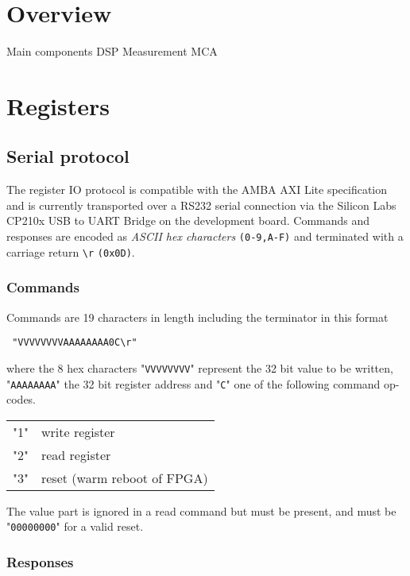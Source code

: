 \documentclass{article}
\newcommand{\code}[1]{\texttt{#1}}
\newenvironment{fielddesc}
{\texttt\bgroup}
{\egroup}
\newcommand{\return}{\code{\textbackslash r}}
\begin{document}
\section{Overview}
Main components 
DSP 
Measurement
MCA


\section{Registers}

\subsection{Serial protocol}

The register IO protocol is compatible with the AMBA AXI Lite specification and
is currently transported over a RS232 serial connection via the Silicon Labs
CP210x USB to UART Bridge on the development board.
Commands and responses are encoded as \emph{ASCII hex characters}
\code{(0-9,A-F)} and terminated with a carriage return \return{} \code{(0x0D)}.

\subsubsection{Commands}

Commands are 19 characters in length including the terminator in this format

\begin{fielddesc}
"VVVVVVVVAAAAAAAA0C\return" 
\end{fielddesc}

where the 8 hex characters "\code{VVVVVVVV}" represent the 32 bit value to be
written, "\code{AAAAAAAA}" the 32 bit register address and "\code{C}" one of the
following command op-codes.

\begin{fielddesc}
\begin{tabular}{l l}
"1" & write register \\
"2" & read register \\
"3" & reset (warm reboot of FPGA)
\end{tabular}
\end{fielddesc} 

The value part is ignored in a read command but must be present, and must be
"\code{00000000}" for a valid reset.

\subsubsection{Responses}
\end{document}
